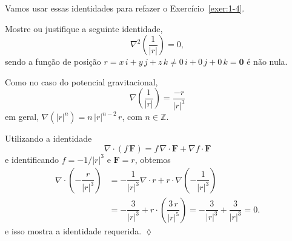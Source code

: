 Vamos usar essas identidades para refazer o Exercício~\ref{exer:1-4}.

\begin{exc}\label{exer:1-6}
	Mostre ou justifique a seguinte identidade,
	\begin{equation*}
		\nabla^{2}\left(\dfrac{1}{|r|}\right) =0,
	\end{equation*}	
	sendo a função de posição \(r=x\, i+y\, j + z\, k \neq 0\,i + 0\, j+ 0\, k=\mathbf{0}\) é não nula.
\end{exc}

\solo
Como no caso do potencial gravitacional,
\begin{equation*}
	\nabla\left(\dfrac{1}{|r|} \right) =\dfrac{-r}{|r|^{3}}
\end{equation*}
em geral, \(\nabla(|r|^{n})=n\, |r|^{n-2}\,r\), com $n \in \mathbb{Z}$.

Utilizando a identidade
\begin{equation*}
	\nabla\cdot \left(f\, \mathbf{F} \right) =f\, \nabla\cdot \mathbf{F} + \nabla f \cdot \mathbf{F}
\end{equation*}
e identificando $f=-1/|r|^{3}$  e $\mathbf{F}= r$, obtemos
\begin{align*}
	\nabla\cdot \left(-\dfrac{r}{|r|^{3}} \right) &=-\dfrac{1}{|r|^{3}}\nabla\cdot r + r\cdot \nabla\left(-\dfrac{1}{|r|^{3}}\right)\\[2ex]
	&=-\dfrac{3}{|r|^{3}} + r \cdot \left(\dfrac{3\,r}{|r|^{5}} \right)=-\dfrac{3}{|r|^{3}}+\dfrac{3}{|r|^{3}}= 0.
\end{align*}
e isso mostra a identidade requerida. \hfill $\lozenge$

%
